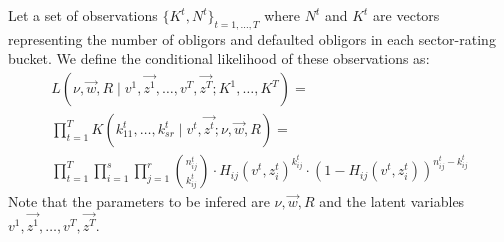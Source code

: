 \documentclass[11pt,fleqn]{book} %
\begin{document}
\begin{definition}
Let a set of observations $\{K^t, N^t\}_{t=1,\dots,T}$ where $N^t$ 
and $K^t$ are vectors representing the number of obligors and defaulted 
obligors in each sector-rating bucket. We define the conditional 
likelihood of these observations as:
\begin{displaymath}
	\begin{array}{l}
		L(\nu,\vec{w},R \mid v^1,\vec{z^1},\dots,v^T,\vec{z^T} ; K^1,\dots,K^T) = \\
		\displaystyle \prod_{t=1}^T K(k_{11}^t,\dots,k_{sr}^t \mid v^t,\vec{z^t}; \nu,\vec{w},R) = \\
		\displaystyle
		\prod_{t=1}^T \prod_{i=1}^s \prod_{j=1}^r 
		\binom{n_{ij}^t}{k_{ij}^t} \cdot
		H_{ij}(v^t,z_i^t)^{k_{ij}^t} \cdot
		\left( 1 - H_{ij}(v^t,z_i^t) \right)^{n_{ij}^t-k_{ij}^t}
	\end{array}
\end{displaymath}
Note that the parameters to be infered are $\nu,\vec{w},R$ and the
latent variables $v^1,\vec{z^1},\dots,v^T,\vec{z^T}$.
\end{definition}
\end{document}

